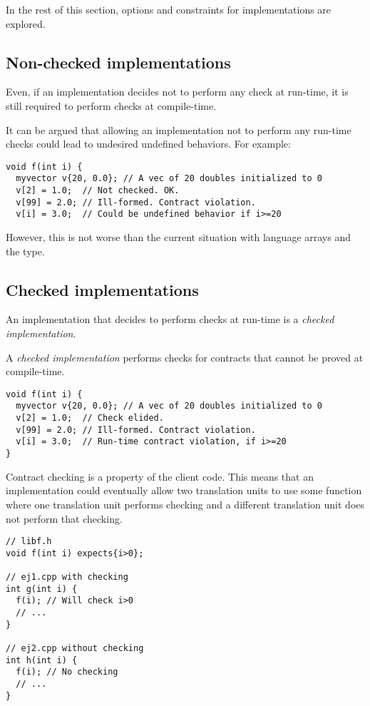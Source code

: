 In the rest of this section, options and constraints for implementations are explored.

\subsection{Non-checked implementations}

Even, if an implementation decides not to perform any check at run-time, it
is still required to perform checks at compile-time.

It can be argued that allowing an implementation not to perform any run-time
checks could lead to undesired undefined behaviors. For example:

\begin{lstlisting}
void f(int i) {
  myvector v{20, 0.0}; // A vec of 20 doubles initialized to 0
  v[2] = 1.0;  // Not checked. OK.
  v[99] = 2.0; // Ill-formed. Contract violation.
  v[i] = 3.0;  // Could be undefined behavior if i>=20
\end{lstlisting}

However, this is not worse than the current situation with language arrays and
the  type.

\subsection{Checked implementations}

An implementation that decides to perform checks at run-time is a \emph{checked
implementation}.

A \emph{checked implementation} performs checks for contracts that cannot be
proved at compile-time.

\begin{lstlisting}
void f(int i) {
  myvector v{20, 0.0}; // A vec of 20 doubles initialized to 0
  v[2] = 1.0;  // Check elided.
  v[99] = 2.0; // Ill-formed. Contract violation.
  v[i] = 3.0;  // Run-time contract violation, if i>=20
}
\end{lstlisting}

Contract checking is a property of the client code. This means that an
implementation could eventually allow two translation units to use some
function where one translation unit performs checking and a different
translation unit does not perform that checking.

\begin{lstlisting}
// libf.h
void f(int i) expects{i>0};

// ej1.cpp with checking
int g(int i) {
  f(i); // Will check i>0
  // ...
}

// ej2.cpp without checking
int h(int i) {
  f(i); // No checking
  // ...
} 
\end{lstlisting}

